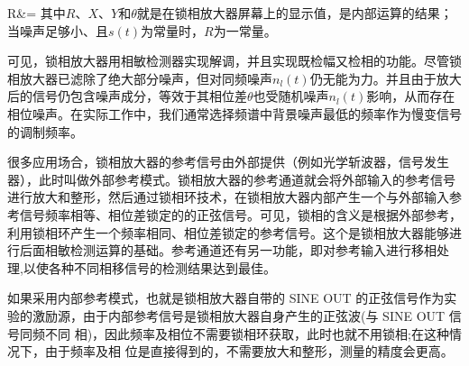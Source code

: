 \documentclass[11pt,a4paper]{ctexart}
\begin{document}
R&=
\eea
其中$R$、$X$、$Y$和$\theta$就是在锁相放大器屏幕上的显示值，是内部运算的结果；当噪声足够小、且$s(t)$为常量时，$R$为一常量。
\par
可见，锁相放大器用相敏检测器实现解调，并且实现既检幅又检相的功能。尽管锁相放大器已滤除了绝大部分噪声，但对同频噪声$n_l (t)$仍无能为力。并且由于放大后的信号仍包含噪声成分，等效于其相位差$\theta$也受随机噪声$n_l (t)$影响，从而存在相位噪声。在实际工作中，我们通常选择频谱中背景噪声最低的频率作为慢变信号的调制频率。\par
很多应用场合，锁相放大器的参考信号由外部提供（例如光学斩波器，信号发生器），此时叫做外部参考模式。锁相放大器的参考通道就会将外部输入的参考信号进行放大和整形，然后通过锁相环技术，在锁相放大器内部产生一个与外部输入参考信号频率相等、相位差锁定的的正弦信号。可见，锁相的含义是根据外部参考，利用锁相环产生一个频率相同、相位差锁定的参考信号。这个是锁相放大器能够进行后面相敏检测运算的基础。参考通道还有另一功能，即对参考输入进行移相处理,以使各种不同相移信号的检测结果达到最佳。
\par
如果采用内部参考模式，也就是锁相放大器自带的 SINE OUT 的正弦信号作为实 验的激励源，由于内部参考信号是锁相放大器自身产生的正弦波(与 SINE OUT 信号同频不同 相)，因此频率及相位不需要锁相环获取，此时也就不用锁相;在这种情况下，由于频率及相 位是直接得到的，不需要放大和整形，测量的精度会更高。
\par
\end{document}
